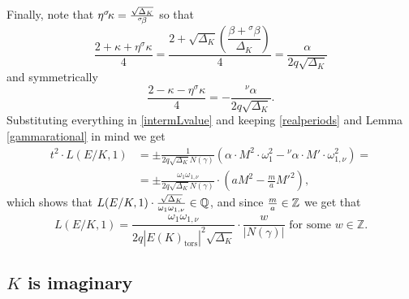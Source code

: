 \documentclass[11pt]{amsart}
\theoremstyle{definition}
\begin{document}
		Finally, note that ${\displaystyle} \eta{{}^\sigma\!}\kappa=\frac{\sqrt{\Delta_K}}{{{}^\sigma\!}\beta}$ so that
		$$\frac{2+\kappa+\eta{{}^\sigma\!}\kappa}{4}=\frac{2+\sqrt{\Delta_K}\left(\dfrac{\beta+{{}^\sigma\!}\beta}{\Delta_K}\right)}{4}=\frac{\alpha}{2q\sqrt{\Delta_K}}$$
		and symmetrically
		$$\frac{2-\kappa-\eta{{}^\sigma\!}\kappa}{4}=-\frac{{{}^\nu\!}\alpha}{2q\sqrt{\Delta_K}}.$$
		Substituting everything in \eqref{intermLvalue} and keeping \eqref{realperiods} and Lemma \ref{gammarational} in mind we get
			\begin{equation*}\begin{split}
				t^2\cdot L(E/K,1) & =\pm\frac{1}{2q\sqrt{\Delta_K}N(\gamma)}\left(\alpha\cdot M^2\cdot \omega_1^2-{{}^\nu\!}\alpha\cdot M'\cdot \omega_{1,\nu}^2\right)=\\
				& =\pm\frac{\omega_1\omega_{1,\nu}}{2q\sqrt{\Delta_K}N(\gamma)}\cdot \left(aM^2-\frac{m}{a}M'^2\right),
				\end{split}
		\end{equation*}
		which shows that ${\displaystyle} L(E/K,1)\cdot \frac{\sqrt{\Delta_K}}{\omega_1\omega_{1,\nu}}\in {\mathbb{Q}}$, and since ${\displaystyle} \frac{m}{a}\in {\mathbb{Z}}$ we get that
			\begin{equation}\label{realquadbound}
				L(E/K,1)=\frac{\omega_1\omega_{1,\nu}}{2q|E(K)_{\text{tors}}|^2\sqrt{\Delta_K}}\cdot \frac{w}{|N(\gamma)|} \mbox{ for some }w\in {\mathbb{Z}}.
		\end{equation}

		\subsection{\texorpdfstring{$K$}{} is imaginary}
\end{document}
